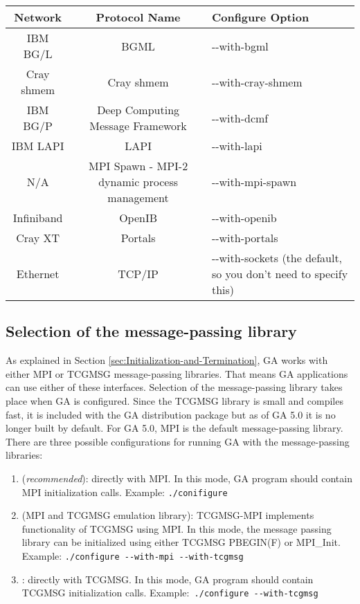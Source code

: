 \begin{tabular}{|c|c|>{\centering}p{3cm}|}
\hline 
Network & Protocol Name & Configure Option\tabularnewline
\hline
\hline 
IBM BG/L & BGML & -{}-with-bgml\tabularnewline
\hline 
Cray shmem & Cray shmem & -{}-with-cray-shmem\tabularnewline
\hline 
IBM BG/P & Deep Computing Message Framework & -{}-with-dcmf\tabularnewline
\hline 
IBM LAPI & LAPI & -{}-with-lapi\tabularnewline
\hline 
N/A & MPI Spawn - MPI-2 dynamic process management & -{}-with-mpi-spawn\tabularnewline
\hline 
Infiniband & OpenIB & -{}-with-openib\tabularnewline
\hline 
Cray XT & Portals & -{}-with-portals\tabularnewline
\hline 
Ethernet & TCP/IP & -{}-with-sockets (the default, so you don't need to specify this)\tabularnewline
\hline
\end{tabular}

\subsection{Selection of the message-passing library}

As explained in Section \ref{sec:Initialization-and-Termination}, GA works with
either MPI or TCGMSG message-passing libraries. That means GA applications can
use either of these interfaces. Selection of the message-passing library takes
place when GA is configured.  Since the TCGMSG library is small and compiles
fast, it is included with the GA distribution package but as of GA 5.0 it is no
longer built by default. For GA 5.0, MPI is the default message-passing
library.  There are three possible configurations for running GA with the
message-passing libraries:

\begin{enumerate}

\item {} (\emph{recommended}): directly with MPI. In this
mode, GA program should contain MPI initialization calls. Example:
\texttt{./conifigure}

\item {} (MPI and TCGMSG emulation library):
TCGMSG-MPI implements functionality of TCGMSG using MPI.  In this mode, the
message passing library can be initialized using either TCGMSG PBEGIN(F) or
MPI\_Init. Example: \texttt{./configure -{}-with-mpi -{}-with-tcgmsg}

\item {}: directly with TCGMSG.  In this mode, GA
program should contain TCGMSG initialization calls.  Example:\texttt{
./configure -{}-with-tcgmsg}

\end{enumerate}

